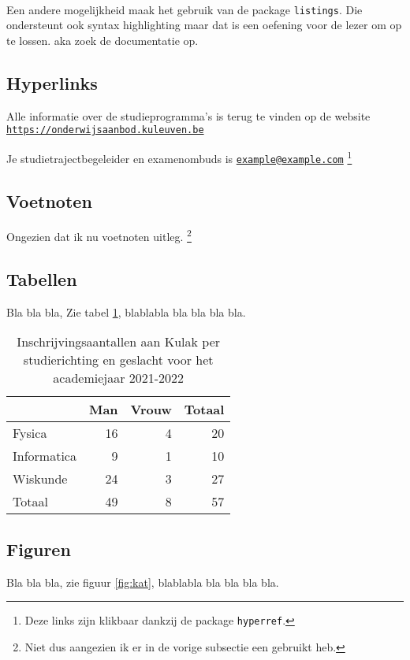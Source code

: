 \documentclass{article} %
\begin{document}
			\
			
			Een andere mogelijkheid maak het gebruik van de package \texttt{listings}. Die ondersteunt ook syntax highlighting maar dat is een oefening voor de lezer om op te lossen. 
			\tiny aka zoek de documentatie op. \normalsize
			
			
		\subsection{Hyperlinks}
			Alle informatie over de studieprogramma's is terug te vinden op de website \href{https://onderwijsaanbod.kuleuven.be}{\texttt{https://onderwijsaanbod.kuleuven.be}}
			
			Je studietrajectbegeleider en examenombuds is \href{mailto:example@example.com}{\texttt{example@example.com}}
			\footnote{Deze links zijn klikbaar dankzij de package \texttt{hyperref}.}
			
		\subsection{Voetnoten}
			Ongezien dat ik nu voetnoten uitleg.
			\footnote{Niet dus aangezien ik er in de vorige subsectie een gebruikt heb.}
			
		\subsection{Tabellen}
			Bla bla bla, Zie tabel \ref{tab:inschijvingen}, blablabla bla bla bla bla.
			
			\begin{table}
				\begin{tabular}{l||rr|r}
					& Man  & Vrouw & Totaal  \\ \hline \hline
					Fysica      & 16 & 4 & 20 \\
					Informatica & 9  & 1 & 10 \\
					Wiskunde    & 24 & 3 & 27 \\ \hline
					Totaal      & 49 & 8 & 57
				\end{tabular}
				\caption{Inschrijvingsaantallen aan Kulak per studierichting en geslacht voor het academiejaar 2021-2022}
				\label{tab:inschijvingen}
			\end{table}
			
		\subsection{Figuren}
			Bla bla bla, zie figuur \ref{fig:kat}, blablabla bla bla bla bla.
			
\end{document}
